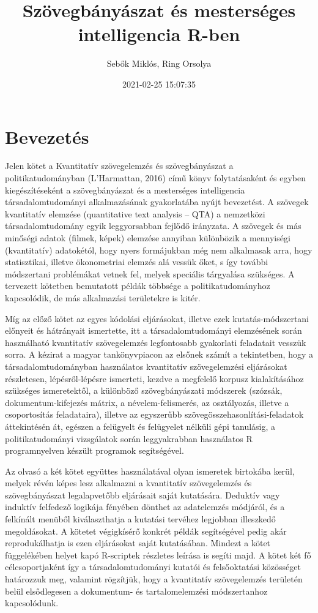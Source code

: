 \documentclass[
]{book}
\title{Szövegbányászat és mesterséges intelligencia R-ben}
\author{Sebők Miklós, Ring Orsolya}
\date{2021-02-25 15:07:35}
\begin{document}
\frontmatter
\maketitle

\mainmatter
\hypertarget{bevezetuxe9s}{%
\chapter{Bevezetés}\label{bevezetuxe9s}}

Jelen kötet a Kvantitatív szövegelemzés és szövegbányászat a
politikatudományban (L'Harmattan, 2016) című könyv folytatásaként és
egyben kiegészítéseként a szövegbányászat és a mesterséges intelligencia
társadalomtudományi alkalmazásának gyakorlatába nyújt bevezetést. A
szövegek kvantitatív elemzése (quantitative text analysis -- QTA) a
nemzetközi társadalomtudomány egyik leggyorsabban fejlődő irányzata. A
szövegek és más minőségi adatok (filmek, képek) elemzése annyiban
különbözik a mennyiségi (kvantitatív) adatokétól, hogy nyers formájukban
még nem alkalmasak arra, hogy statisztikai, illetve ökonometriai elemzés
alá vessük őket, s így további módszertani problémákat vetnek fel,
melyek speciális tárgyalása szükséges. A tervezett kötetben bemutatott
példák többsége a politikatudományhoz kapcsolódik, de más alkalmazási
területekre is kitér.

Míg az előző kötet az egyes kódolási eljárásokat, illetve ezek
kutatás-módszertani előnyeit és hátrányait ismertette, itt a
társadalomtudományi elemzésének során használható kvantitatív
szövegelemzés legfontosabb gyakorlati feladatait vesszük sorra. A
kézirat a magyar tankönyvpiacon az elsőnek számít a tekintetben, hogy a
társadalomtudományban használatos kvantitatív szövegelemzési eljárásokat
részletesen, lépésről-lépésre ismerteti, kezdve a megfelelő korpusz
kialakításához szükséges ismeretektől, a különböző szövegbányászati
módszerek (szózsák, dokumentum-kifejezés mátrix, a névelem-felismerés,
az osztályozás, illetve a csoportosítás feladataira), illetve az
egyszerűbb szövegösszehasonlítási-feladatok áttekintésén át, egészen a
felügyelt és felügyelet nélküli gépi tanulásig, a politikatudományi
vizsgálatok során leggyakrabban használatos R programnyelven készült
programok segítségével.

Az olvasó a két kötet együttes használatával olyan ismeretek birtokába
kerül, melyek révén képes lesz alkalmazni a kvantitatív szövegelemzés és
szövegbányászat legalapvetőbb eljárásait saját kutatására. Deduktív vagy
induktív felfedező logikája fényében dönthet az adatelemzés módjáról, és
a felkínált menüből kiválaszthatja a kutatási tervéhez legjobban
illeszkedő megoldásokat. A kötetet végigkísérő konkrét példák
segítségével pedig akár reprodukálhatja is ezen eljárásokat saját
kutatásában. Mindezt a kötet függelékében helyet kapó R-scriptek
részletes leírása is segíti majd. A kötet két fő célcsoportjaként így a
társadalomtudományi kutatói és felsőoktatási közösséget határozzuk meg,
valamint rögzítjük, hogy a kvantitatív szövegelemzés területén belül
elsődlegesen a dokumentum- és tartalomelemzési módszertanhoz
kapcsolódunk.
\end{document}

